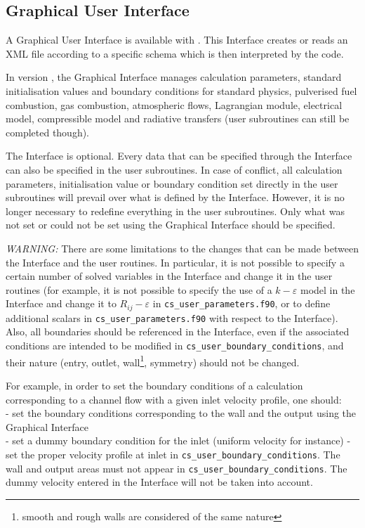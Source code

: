 {{{%
\subsection{Graphical User Interface}
\label{sec:prg_gui}%
A Graphical User Interface is available with \CS.
This Interface creates or reads an XML file according to
a specific \CS schema which is then interpreted by the code.

In version \verscs, the Graphical Interface manages calculation parameters,
standard initialisation values and boundary
conditions for standard physics, pulverised fuel combustion, gas combustion,
atmospheric flows, Lagrangian module,  electrical model, compressible model and radiative
transfers (user subroutines can still be completed though).

The Interface is optional. Every data that can be specified through the
Interface can also be specified in the user subroutines. In case of
conflict, all calculation parameters, initialisation value or boundary condition
set directly in the user subroutines will prevail over what is defined by the
Interface. However, it is no longer necessary to redefine everything in the
user subroutines. Only what was not set or could not be set using the Graphical
Interface should be specified.

{\em WARNING: }
There are some limitations to the changes that can be made between the Interface
and the user routines. In particular, it is not possible to specify a certain
number of solved variables in the Interface and change it in the user routines
(for example, it is not possible to specify the use of a $k-\varepsilon$ model
in the Interface and change it to $R_{ij}-\varepsilon$ in \texttt{cs\_user\_parameters.f90}, or
to define additional scalars in \texttt{cs\_user\_parameters.f90} with respect to the
Interface). Also, all boundaries should be referenced in the Interface, even if
the associated conditions are intended to be modified in \texttt{cs\_user\_boundary\_conditions}, and
their nature (entry, outlet, wall\footnote{smooth and rough walls are considered
of the same nature}, symmetry) should not be changed.

For example, in order to set the boundary conditions of a calculation
corresponding to a channel flow with a given inlet velocity profile, one
should:\\
- set the boundary conditions corresponding to the wall and the output
using the Graphical Interface\\
- set a dummy boundary condition for the inlet (uniform velocity for instance)
- set the proper velocity profile at inlet in \texttt{cs\_user\_boundary\_conditions}. The wall and
output areas must not appear in \texttt{cs\_user\_boundary\_conditions}. The dummy velocity
entered in the Interface will not be taken into account.

}}}
